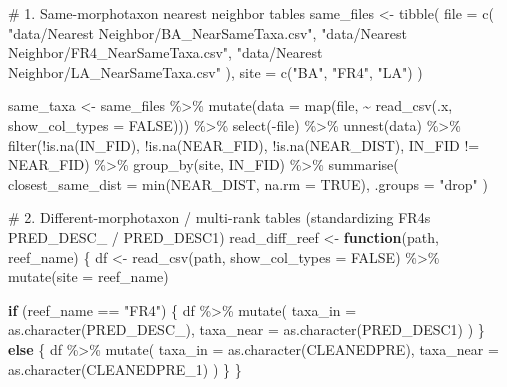 \documentclass[
  letterpaper,
  DIV=11,
  numbers=noendperiod]{scrartcl}
\newenvironment{Shaded}{\begin{snugshade}}{\end{snugshade}}
\newcommand{\AttributeTok}[1]{\textcolor[rgb]{0.40,0.45,0.13}{#1}}
\newcommand{\CommentTok}[1]{\textcolor[rgb]{0.37,0.37,0.37}{#1}}
\newcommand{\ConstantTok}[1]{\textcolor[rgb]{0.56,0.35,0.01}{#1}}
\newcommand{\ControlFlowTok}[1]{\textcolor[rgb]{0.00,0.23,0.31}{\textbf{#1}}}
\newcommand{\FunctionTok}[1]{\textcolor[rgb]{0.28,0.35,0.67}{#1}}
\newcommand{\NormalTok}[1]{\textcolor[rgb]{0.00,0.23,0.31}{#1}}
\newcommand{\OtherTok}[1]{\textcolor[rgb]{0.00,0.23,0.31}{#1}}
\newcommand{\SpecialCharTok}[1]{\textcolor[rgb]{0.37,0.37,0.37}{#1}}
\newcommand{\StringTok}[1]{\textcolor[rgb]{0.13,0.47,0.30}{#1}}
\begin{document}
\begin{Shaded}
\begin{Highlighting}[]
\CommentTok{\# 1. Same{-}morphotaxon nearest neighbor tables}
\NormalTok{same\_files }\OtherTok{\textless{}{-}} \FunctionTok{tibble}\NormalTok{(}
  \AttributeTok{file =} \FunctionTok{c}\NormalTok{(}
    \StringTok{"data/Nearest Neighbor/BA\_NearSameTaxa.csv"}\NormalTok{,}
    \StringTok{"data/Nearest Neighbor/FR4\_NearSameTaxa.csv"}\NormalTok{,}
    \StringTok{"data/Nearest Neighbor/LA\_NearSameTaxa.csv"}
\NormalTok{  ),}
  \AttributeTok{site =} \FunctionTok{c}\NormalTok{(}\StringTok{"BA"}\NormalTok{, }\StringTok{"FR4"}\NormalTok{, }\StringTok{"LA"}\NormalTok{)}
\NormalTok{)}

\NormalTok{same\_taxa }\OtherTok{\textless{}{-}}\NormalTok{ same\_files }\SpecialCharTok{\%\textgreater{}\%}
  \FunctionTok{mutate}\NormalTok{(}\AttributeTok{data =} \FunctionTok{map}\NormalTok{(file, }\SpecialCharTok{\textasciitilde{}} \FunctionTok{read\_csv}\NormalTok{(.x, }\AttributeTok{show\_col\_types =} \ConstantTok{FALSE}\NormalTok{))) }\SpecialCharTok{\%\textgreater{}\%}
  \FunctionTok{select}\NormalTok{(}\SpecialCharTok{{-}}\NormalTok{file) }\SpecialCharTok{\%\textgreater{}\%}
  \FunctionTok{unnest}\NormalTok{(data) }\SpecialCharTok{\%\textgreater{}\%}
  \FunctionTok{filter}\NormalTok{(}\SpecialCharTok{!}\FunctionTok{is.na}\NormalTok{(IN\_FID), }\SpecialCharTok{!}\FunctionTok{is.na}\NormalTok{(NEAR\_FID), }\SpecialCharTok{!}\FunctionTok{is.na}\NormalTok{(NEAR\_DIST), IN\_FID }\SpecialCharTok{!=}\NormalTok{ NEAR\_FID) }\SpecialCharTok{\%\textgreater{}\%}
  \FunctionTok{group\_by}\NormalTok{(site, IN\_FID) }\SpecialCharTok{\%\textgreater{}\%}
  \FunctionTok{summarise}\NormalTok{(}
    \AttributeTok{closest\_same\_dist =} \FunctionTok{min}\NormalTok{(NEAR\_DIST, }\AttributeTok{na.rm =} \ConstantTok{TRUE}\NormalTok{),}
    \AttributeTok{.groups =} \StringTok{"drop"}
\NormalTok{  )}

\CommentTok{\# 2. Different{-}morphotaxon / multi{-}rank tables (standardizing FR4\textquotesingle{}s PRED\_DESC\_ / PRED\_DESC1)}
\NormalTok{read\_diff\_reef }\OtherTok{\textless{}{-}} \ControlFlowTok{function}\NormalTok{(path, reef\_name) \{}
\NormalTok{  df }\OtherTok{\textless{}{-}} \FunctionTok{read\_csv}\NormalTok{(path, }\AttributeTok{show\_col\_types =} \ConstantTok{FALSE}\NormalTok{) }\SpecialCharTok{\%\textgreater{}\%}
    \FunctionTok{mutate}\NormalTok{(}\AttributeTok{site =}\NormalTok{ reef\_name)}

  \ControlFlowTok{if}\NormalTok{ (reef\_name }\SpecialCharTok{==} \StringTok{"FR4"}\NormalTok{) \{}
\NormalTok{    df }\SpecialCharTok{\%\textgreater{}\%}
      \FunctionTok{mutate}\NormalTok{(}
        \AttributeTok{taxa\_in =} \FunctionTok{as.character}\NormalTok{(PRED\_DESC\_),}
        \AttributeTok{taxa\_near =} \FunctionTok{as.character}\NormalTok{(PRED\_DESC1)}
\NormalTok{      )}
\NormalTok{  \} }\ControlFlowTok{else}\NormalTok{ \{}
\NormalTok{    df }\SpecialCharTok{\%\textgreater{}\%}
      \FunctionTok{mutate}\NormalTok{(}
        \AttributeTok{taxa\_in =} \FunctionTok{as.character}\NormalTok{(CLEANEDPRE),}
        \AttributeTok{taxa\_near =} \FunctionTok{as.character}\NormalTok{(CLEANEDPRE\_1)}
\NormalTok{      )}
\NormalTok{  \}}
\NormalTok{\}}


\end{Highlighting}
\end{Shaded}
\end{document}
